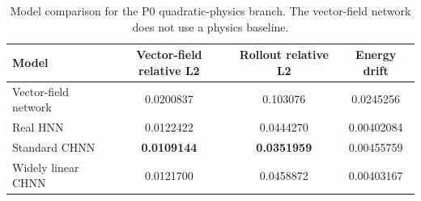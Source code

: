 \begin{table}[htbp]
\centering
\caption{Model comparison for the P0 quadratic-physics branch. The vector-field network does not use a physics baseline.}
\label{tab:p0-summary}
\small
\begin{tabular}{@{}lccc@{}}
\toprule
Model & Vector-field relative L2 & Rollout relative L2 & Energy drift \\
\midrule
Vector-field network & 0.0200837 & 0.103076 & 0.0245256 \\
Real HNN & 0.0122422 & 0.0444270 & 0.00402084 \\
Standard CHNN & \textbf{0.0109144} & \textbf{0.0351959} & 0.00455759 \\
Widely linear CHNN & 0.0121700 & 0.0458872 & 0.00403167 \\
\bottomrule
\end{tabular}
\end{table}
